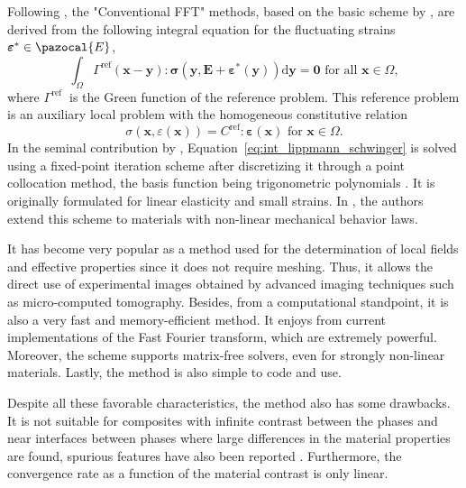 Following \cite{zeman_finite_2017}, the "Conventional FFT" methods, based on the basic scheme by \cite{moulinec_fast_1994}, are derived from the following integral equation for the fluctuating strains \(\bm\varepsilon^{*} \in \pazocal{E}\),
\begin{equation} \label{eq:int_lippmann_schwinger}
\int_{\Omega} \Gamma^{\mathrm{ref}}(\boldsymbol{x}-\boldsymbol{y}): \boldsymbol{\sigma}\left(\boldsymbol{y}, \boldsymbol{E}+\bm \varepsilon^{*}(\boldsymbol{y})\right) \mathrm{d} \boldsymbol{y}=\mathbf{0} \text { for all } \boldsymbol{x} \in \Omega,
\end{equation}
where \(\Gamma^{\text {ref }}\) is the Green function of the reference problem.
This reference problem is an auxiliary local problem with the homogeneous constitutive relation
\begin{equation}
\sigma(\boldsymbol{x}, \varepsilon(\boldsymbol{x}))=C^{\mathrm{ref}}: \bm\varepsilon(\boldsymbol{x}) \text { for } \boldsymbol{x} \in \Omega.
\end{equation}
In the seminal contribution by \cite{moulinec_fast_1994, moulinec_fft-based_1995}, Equation~\eqref{eq:int_lippmann_schwinger} is solved using a fixed-point iteration scheme after discretizing it through a point collocation method, the basis function being trigonometric polynomials \citep{zeman_finite_2017}.
It is originally formulated for linear elasticity and small strains.
In \cite{michel_computational_2000, michel_computational_2001}, the authors extend this scheme to materials with non-linear mechanical behavior laws.

It has become very popular as a method used for the determination of local fields and effective properties since it does not require meshing.
Thus, it allows the direct use of experimental images obtained by advanced imaging techniques such as micro-computed tomography.
Besides, from a computational standpoint, it is also a very fast and memory-efficient method.
It enjoys from current implementations of the Fast Fourier transform, which are extremely powerful.
Moreover, the scheme supports matrix-free solvers, even for strongly non-linear materials.
Lastly, the method is also simple to code and use.

Despite all these favorable characteristics, the method also has some drawbacks.
It is not suitable for composites with infinite contrast between the phases and near interfaces between phases where large differences in the material properties are found, spurious features have also been reported \citep{ma_numerical_2021}.
Furthermore, the convergence rate as a function of the material contrast is only linear.

